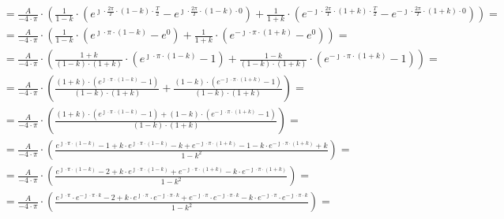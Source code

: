 \begin{task}
\begin{align*}
&=\frac{A}{-4 \cdot \pi} \cdot \left( \frac{1}{1 - k} \cdot \left(
e^{\jmath \cdot \frac{2\pi}{T} \cdot \left(1 - k\right)\cdot \frac{T}{2}} - e^{\jmath \cdot \frac{2\pi}{T} \cdot \left(1 - k\right)\cdot 0} \right) + \frac{1}{1+k} \cdot \left( e^{-\jmath \cdot \frac{2\pi}{T} \cdot \left(1+k\right)\cdot \frac{T}{2}} - e^{-\jmath \cdot \frac{2\pi}{T} \cdot \left(1+k\right)\cdot 0}\right) \right)=\\
&=\frac{A}{-4 \cdot \pi} \cdot \left( \frac{1}{1 - k} \cdot \left(
e^{\jmath \cdot \pi \cdot \left(1 - k\right)} - e^{0} \right) + \frac{1}{1+k} \cdot \left( e^{-\jmath \cdot \pi \cdot \left(1+k\right)} - e^{0}\right) \right)=\\
&=\frac{A}{-4 \cdot \pi} \cdot \left( \frac{1+k}{\left(1 - k\right)\cdot \left(1+k\right)} \cdot \left(
e^{\jmath \cdot \pi \cdot \left(1 - k\right)} - 1 \right) + \frac{1-k}{\left(1 - k\right)\cdot \left(1+k\right)} \cdot \left( e^{-\jmath \cdot \pi \cdot \left(1+k\right)} - 1\right) \right)=\\
&=\frac{A}{-4 \cdot \pi} \cdot \left( \frac{\left(1+k\right)\cdot \left(
  e^{\jmath \cdot \pi \cdot \left(1 - k\right)} - 1 \right)}{\left(1 - k\right)\cdot \left(1+k\right)} + \frac{\left(1-k\right)\cdot \left( e^{-\jmath \cdot \pi \cdot \left(1+k\right)} - 1\right)}{\left(1 - k\right)\cdot \left(1+k\right)} \right)=\\
&=\frac{A}{-4 \cdot \pi} \cdot \left( \frac{\left(1+k\right)\cdot \left(
  e^{\jmath \cdot \pi \cdot \left(1 - k\right)} - 1 \right)+\left(1-k\right)\cdot \left( e^{-\jmath \cdot \pi \cdot \left(1+k\right)} - 1\right)}{\left(1 - k\right)\cdot \left(1+k\right)} \right)=\\
&=\frac{A}{-4 \cdot \pi} \cdot \left( \frac{e^{\jmath \cdot \pi \cdot \left(1 - k\right)} - 1 + k\cdot e^{\jmath \cdot \pi \cdot \left(1 - k\right)} - k+ e^{-\jmath \cdot \pi \cdot \left(1+k\right)} - 1 - k \cdot e^{-\jmath \cdot \pi \cdot \left(1+k\right)} + k}{1-k^2} \right)=\\
&=\frac{A}{-4 \cdot \pi} \cdot \left( \frac{e^{\jmath \cdot \pi \cdot \left(1 - k\right)} - 2 + k\cdot e^{\jmath \cdot \pi \cdot \left(1 - k\right)}+ e^{-\jmath \cdot \pi \cdot \left(1+k\right)} - k \cdot e^{-\jmath \cdot \pi \cdot \left(1+k\right)}}{1-k^2} \right)=\\
&=\frac{A}{-4 \cdot \pi} \cdot \left( \frac{e^{\jmath \cdot \pi}\cdot e^{-\jmath \cdot \pi \cdot k} - 2 + k\cdot e^{\jmath \cdot \pi } \cdot e^{-\jmath \cdot \pi \cdot k}+ e^{-\jmath \cdot \pi} \cdot e^{-\jmath \cdot \pi \cdot k} - k \cdot e^{-\jmath \cdot \pi}\cdot e^{-\jmath \cdot \pi \cdot k}}{1-k^2} \right)=\\

\end{align*}
\end{task}
